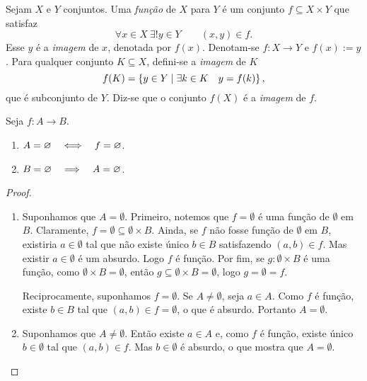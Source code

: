\begin{defi}
Sejam $X$ e $Y$ conjuntos. Uma \emph{função} de $X$ para $Y$ é um conjunto $f \subseteq X \times Y$ que satisfaz
	\begin{equation*}
	\forall x \in X \ \exists! y \in Y \qquad (x,y) \in f.
	\end{equation*}
Esse $y$ é a \emph{imagem} de $x$, denotada por $f(x)$. Denotam-se $f: X \to Y$ e $f(x) := y$. Para qualquer conjunto $K \subseteq X$, defini-se a \emph{imagem} de $K$
	\begin{equation*}
	f(K)=\left\{y \in Y \;\middle\vert\; \exists k \in K \quad y=f(k) \right\},
	\end{equation*}
que é subconjunto de $Y$. Diz-se que o conjunto $f(X)$ é a \emph{imagem} de $f$.
\end{defi}

\begin{prop}
	Seja $f: A \to B$.
	\begin{enumerate}
	\item $A=\varnothing \quad \Longleftrightarrow \quad f=\varnothing$.
	\item $B=\varnothing \quad \Longrightarrow \quad A=\varnothing$.
	\end{enumerate}
\end{prop}
\begin{proof}
	\begin{enumerate}
	\item Suponhamos que $A=\emptyset$. Primeiro, notemos que $f=\emptyset$ é uma função de $\emptyset$ em $B$. Claramente, $f = \emptyset \subseteq \emptyset \times B$. Ainda, se $f$ não fosse função de $\emptyset$ em $B$, existiria $a \in \emptyset$ tal que não existe único $b \in B$ satisfazendo $(a,b) \in f$. Mas existir $a \in \emptyset$ é um absurdo. Logo $f$ é função. Por fim, se $g: \emptyset \times B$ é uma função, como $\emptyset \times B = \emptyset$, então $g \subseteq \emptyset \times B = \emptyset$, logo $g=\emptyset=f$.
	
	Reciprocamente, suponhamos $f=\emptyset$. Se $A \neq \emptyset$, seja $a \in A$. Como $f$ é função, existe $b \in B$ tal que $(a,b) \in f=\emptyset$, o que é absurdo. Portanto $A=\emptyset$.
	
	\item Suponhamos que $A \neq \emptyset$. Então existe $a \in A$ e, como $f$ é função, existe único $b \in \emptyset$ tal que $(a,b) \in f$. Mas $b \in \emptyset$ é absurdo, o que mostra que $A = \emptyset$.
	\end{enumerate}
\end{proof}

